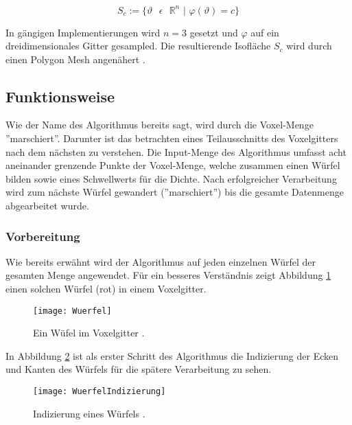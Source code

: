 \begin{equation}
\label{mat:isoDef}
S_{c} := \{ \vartheta \text{ } \epsilon \text{ } \mathbb{R}^{n} \text{ | } \varphi(\vartheta) = c\}
\end{equation} 

\noindent In gängigen Implementierungen wird $n = 3$ gesetzt und $\varphi$ auf ein dreidimensionales Gitter gesampled. Die resultierende Isofläche $S_{c}$ wird durch einen Polygon Mesh angenähert \citep{SeibtBak}.
\subsection{Funktionsweise}

Wie der Name des Algorithmus bereits sagt, wird durch die Voxel-Menge ''marschiert''. Darunter ist das betrachten eines Teilausschnitts des Voxelgitters nach dem nächsten zu verstehen. Die Input-Menge des Algorithmus umfasst acht aneinander grenzende Punkte der Voxel-Menge, welche zusammen einen Würfel bilden sowie eines Schwellwerts für die Dichte. Nach erfolgreicher Verarbeitung wird zum nächste Würfel gewandert (''marschiert'') bis die gesamte Datenmenge abgearbeitet wurde.
\subsubsection{Vorbereitung}
Wie bereits erwähnt wird der Algorithmus auf jeden einzelnen Würfel der gesamten Menge angewendet. Für ein besseres Verständnis zeigt Abbildung \ref{fig:Wuerfel} einen solchen Würfel (rot) in einem Voxelgitter.
\begin{figure}[H]
	\centering
	\texttt{[image: Wuerfel]}
	\caption{Ein Wüfel im Voxelgitter \citep{SeibtBak}.}
	\label{fig:Wuerfel}
\end{figure}
\noindent In Abbildung \ref{fig:WuerfelIndizierung} ist als erster Schritt des Algorithmus die Indizierung der Ecken und Kanten des Würfels für die spätere Verarbeitung zu sehen.
\begin{figure}[H]
	\centering
	\texttt{[image: WuerfelIndizierung]}
	\caption{Indizierung eines Würfels \citep{SeibtBak}.}
	\label{fig:WuerfelIndizierung}
\end{figure}

